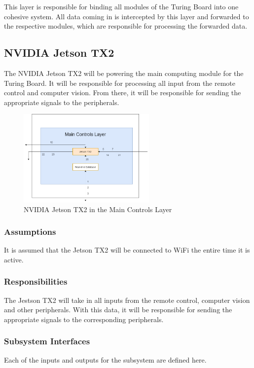 This layer is responsible for binding all modules of the Turing Board into one cohesive system. All data coming in is intercepted by this layer and forwarded to the respective modules, which are responsible for processing the forwarded data.

\subsection{NVIDIA Jetson TX2}
The NVIDIA Jetson TX2 will be powering the main computing module for the Turing Board. It will be responsible for processing all input from the remote control and computer vision. From there, it will be responsible for sending the appropriate signals to the peripherals.

\begin{figure}[h!]
	\centering
 	\includegraphics[width=0.60\textwidth]{images/Jetson.png}
 \caption{NVIDIA Jetson TX2 in the Main Controls Layer}
\end{figure}

\subsubsection{Assumptions}
It is assumed that the Jetson TX2 will be connected to WiFi the entire time it is active. 

\subsubsection{Responsibilities}
The Jestson TX2 will take in all inputs from the remote control, computer vision and other peripherals. With this data, it will be responsible for sending the appropriate signals to the corresponding peripherals.

\subsubsection{Subsystem Interfaces}
Each of the inputs and outputs for the subsystem are defined here.

